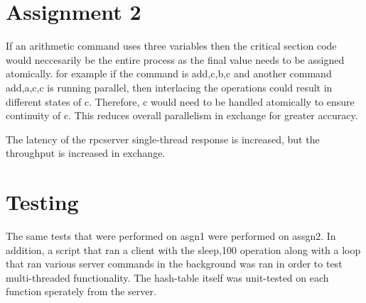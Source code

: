 \documentclass[11pt,letterpaper]{article}
\begin{document}
\section*{Assignment 2}
	If an arithmetic command uses three variables then the critical section code would neccesarily be the entire process as the final value needs to be assigned atomically. for example if the command is add,c,b,c and another command add,a,c,c is running parallel, then interlacing the operations could result in different states of c. Therefore, c would need to be handled atomically to ensure continuity of c. This reduces overall parallelism in exchange for greater accuracy.
	
	The latency of the rpcserver single-thread response is increased, but the throughput is increased in exchange.
	
\section*{Testing}
The same tests that were performed on asgn1 were performed on assgn2. In addition, a script that ran a client with the sleep,100 operation along with a loop that ran various server commands in the background was ran in order to test multi-threaded functionality. The hash-table itself was unit-tested on each function sperately from the server. 
\end{document}
